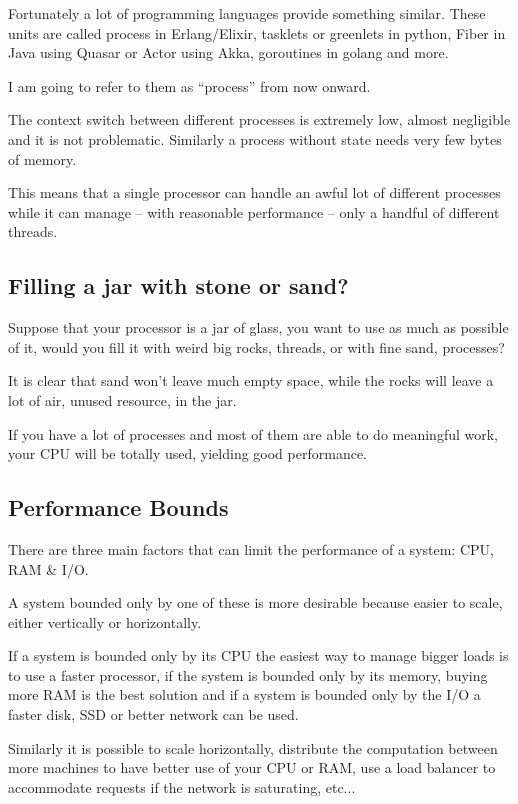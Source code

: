 \documentclass[12pt]{article} %
\begin{document}
Fortunately a lot of programming languages provide something similar. These units are called process in Erlang/Elixir, tasklets or greenlets in python, Fiber in Java using Quasar or Actor using Akka, goroutines in golang and more.

I am going to refer to them as ``process'' from now onward.

The context switch between different processes is extremely low, almost negligible and it is not problematic. Similarly a process without state needs very few bytes of memory.

This means that a single processor can handle an awful lot of different processes while it can manage -- with reasonable performance -- only a handful of different threads.

	\subsection{Filling a jar with stone or sand?}
	
Suppose that your processor is a jar of glass, you want to use as much as possible of it, would you fill it with weird big rocks, threads, or with fine sand, processes?

It is clear that sand won't leave much empty space, while the rocks will leave a lot of air, unused resource, in the jar.

If you have a lot of processes and most of them are able to do meaningful work, your CPU will be totally used, yielding good performance.
	
	\subsection{Performance Bounds}

There are three main factors that can limit the performance of a system: CPU, RAM \& I/O.

A system bounded only by one of these is more desirable because easier to scale, either vertically or horizontally.

If a system is bounded only by its CPU the easiest way to manage bigger loads is to use a faster processor, if the system is bounded only by its memory, buying more RAM is the best solution and if a system is bounded only by the I/O a faster disk, SSD or better network can be used.

Similarly it is possible to scale horizontally, distribute the computation between more machines to have better use of your CPU or RAM, use a load balancer to accommodate requests if the network is saturating, etc...
\end{document}
